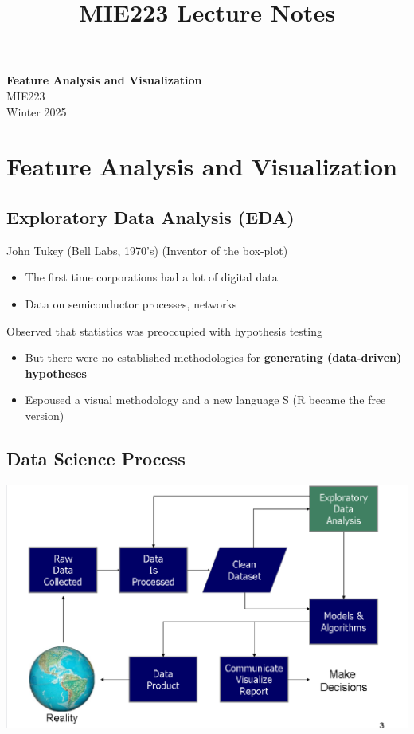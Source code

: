 \documentclass[11pt]{article}
\theoremstyle{definition}
\begin{document}
\setcounter{section}{0}
\title{MIE223 Lecture Notes}

\thispagestyle{empty}

\begin{center}
{\LARGE \bf Feature Analysis and Visualization}\\
{\large MIE223}\\
Winter 2025
\end{center}
\section{Feature Analysis and Visualization}
\subsection{Exploratory Data Analysis (EDA)}
John Tukey (Bell Labs, 1970’s) (Inventor of the box-plot)
\begin{itemize}
  \item The first time corporations had a lot of digital data
  \item Data on semiconductor processes, networks
\end{itemize}

Observed that statistics was preoccupied with
hypothesis testing
\begin{itemize}
  \item But there were no established methodologies for
  \textbf{generating (data-driven) hypotheses}
  \item Espoused a visual methodology and a new language
  S (R became the free version)
\end{itemize}
\subsection{Data Science Process}
\includegraphics[width=\textwidth]{1.png}
\end{document}
